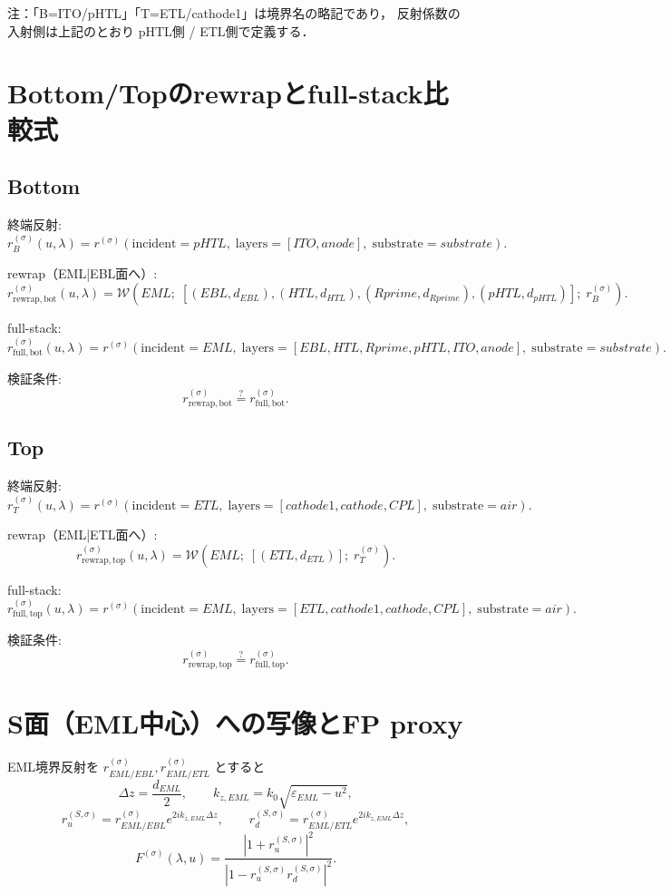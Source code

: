 \documentclass[a4paper,11pt]{article}
\begin{document}
注：「B=ITO/pHTL」「T=ETL/cathode1」は境界名の略記であり，
反射係数の入射側は上記のとおり pHTL側 / ETL側で定義する．

\section{Bottom/Topのrewrapとfull-stack比較式}

\subsection{Bottom}
終端反射:
\[
r_B^{(\sigma)}(u,\lambda)
=
r^{(\sigma)}\!\left(
\mathrm{incident}=pHTL,\;
\mathrm{layers}=[ITO,anode],\;
\mathrm{substrate}=substrate
\right).
\]

rewrap（EML|EBL面へ）:
\[
r_{\mathrm{rewrap,bot}}^{(\sigma)}(u,\lambda)
=
\mathcal W\!\left(
EML;\;
[(EBL,d_{EBL}),(HTL,d_{HTL}),(Rprime,d_{Rprime}),(pHTL,d_{pHTL})];\;
r_B^{(\sigma)}
\right).
\]

full-stack:
\[
r_{\mathrm{full,bot}}^{(\sigma)}(u,\lambda)
=
r^{(\sigma)}\!\left(
\mathrm{incident}=EML,\;
\mathrm{layers}=[EBL,HTL,Rprime,pHTL,ITO,anode],\;
\mathrm{substrate}=substrate
\right).
\]

検証条件:
\[
r_{\mathrm{rewrap,bot}}^{(\sigma)}
\stackrel{?}{=}
r_{\mathrm{full,bot}}^{(\sigma)}.
\]

\subsection{Top}
終端反射:
\[
r_T^{(\sigma)}(u,\lambda)
=
r^{(\sigma)}\!\left(
\mathrm{incident}=ETL,\;
\mathrm{layers}=[cathode1,cathode,CPL],\;
\mathrm{substrate}=air
\right).
\]

rewrap（EML|ETL面へ）:
\[
r_{\mathrm{rewrap,top}}^{(\sigma)}(u,\lambda)
=
\mathcal W\!\left(
EML;\;
[(ETL,d_{ETL})];\;
r_T^{(\sigma)}
\right).
\]

full-stack:
\[
r_{\mathrm{full,top}}^{(\sigma)}(u,\lambda)
=
r^{(\sigma)}\!\left(
\mathrm{incident}=EML,\;
\mathrm{layers}=[ETL,cathode1,cathode,CPL],\;
\mathrm{substrate}=air
\right).
\]

検証条件:
\[
r_{\mathrm{rewrap,top}}^{(\sigma)}
\stackrel{?}{=}
r_{\mathrm{full,top}}^{(\sigma)}.
\]

\section{S面（EML中心）への写像とFP proxy}
EML境界反射を \(r_{EML/EBL}^{(\sigma)}, r_{EML/ETL}^{(\sigma)}\) とすると
\[
\Delta z=\frac{d_{EML}}{2},\qquad
k_{z,EML}=k_0\sqrt{\varepsilon_{EML}-u^2},
\]
\[
r_u^{(S,\sigma)}=r_{EML/EBL}^{(\sigma)}e^{2ik_{z,EML}\Delta z},\qquad
r_d^{(S,\sigma)}=r_{EML/ETL}^{(\sigma)}e^{2ik_{z,EML}\Delta z},
\]
\[
F^{(\sigma)}(\lambda,u)=
\frac{|1+r_u^{(S,\sigma)}|^2}{|1-r_u^{(S,\sigma)}r_d^{(S,\sigma)}|^2}.
\]
\end{document}
